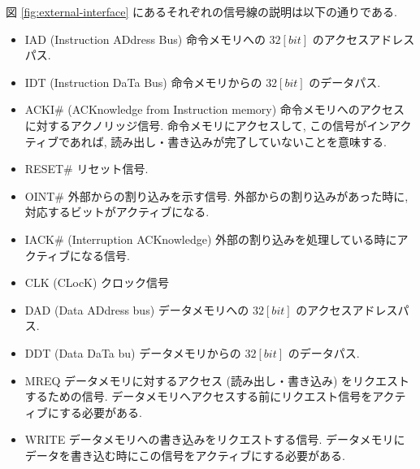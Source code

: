 \documentclass[../specifications.tex]{subfiles}
\begin{document}
  図 \ref{fig:external-interface} にあるそれぞれの信号線の説明は以下の通りである.
  \begin{itemize}
    \item IAD (Instruction ADdress Bus)
    \newline 命令メモリへの $32[bit]$ のアクセスアドレスパス.

    \item IDT (Instruction DaTa Bus)
    \newline 命令メモリからの $32[bit]$ のデータパス.

    \item ACKI\# (ACKnowledge from Instruction memory)
    \newline 命令メモリへのアクセスに対するアクノリッジ信号.
    命令メモリにアクセスして, この信号がインアクティブであれば, 
    読み出し・書き込みが完了していないことを意味する.
    
    \item RESET\#
    \newline リセット信号.

    \item OINT\#
    \newline 外部からの割り込みを示す信号.
    外部からの割り込みがあった時に, 対応するビットがアクティブになる.

    \item IACK\# (Interruption ACKnowledge)
    \newline 外部の割り込みを処理している時にアクティブになる信号.

    \item CLK (CLocK)
    \newline クロック信号

    \item DAD (Data ADdress bus)
    \newline データメモリへの $32[bit]$ のアクセスアドレスパス.

    \item DDT (Data DaTa bu)
    \newline データメモリからの $32[bit]$ のデータパス.

    \item MREQ
    \newline データメモリに対するアクセス (読み出し・書き込み) をリクエストするための信号.
    データメモリへアクセスする前にリクエスト信号をアクティブにする必要がある.

    \item WRITE
    \newline データメモリへの書き込みをリクエストする信号.
    データメモリにデータを書き込む時にこの信号をアクティブにする必要がある.


\end{itemize}
\end{document}
